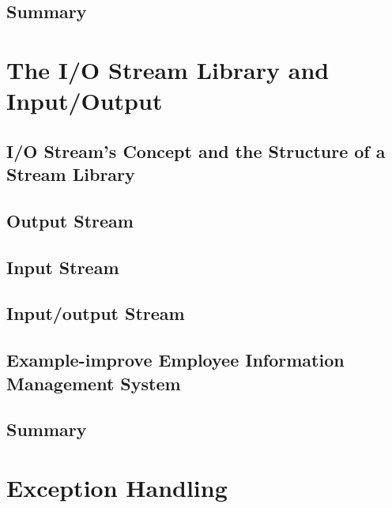 \documentclass[a4paper]{article}
\begin{document}
\subsection{Summary}

\newpage
\section{The I/O Stream Library and Input/Output}
\subsection{I/O Stream’s Concept and the Structure of a Stream Library}

\subsection{Output Stream}

\subsection{Input Stream}

\subsection{Input/output Stream}

\subsection{Example-improve Employee Information Management System}

\subsection{Summary}


\newpage
\section{Exception Handling}
\end{document}
